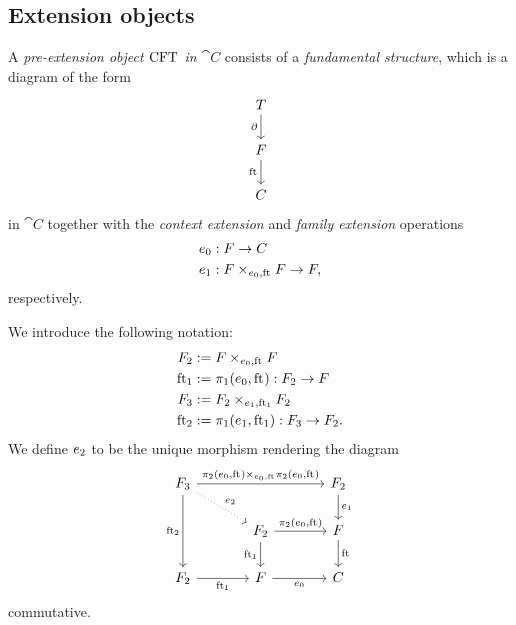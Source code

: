 \subsection{Extension objects}
\begin{defn}
A \emph{pre-extension object $\mathrm{CFT}$ in $\cat{C}$} consists of a \emph{fundamental structure}, which is a diagram of the form
\begin{equation*}
\begin{tikzcd}
\stesyst
  \ar{d}[swap]{\ebd}
  \\
\stesysf
  \ar{d}[swap]{\eft}
  \\
\stesysc
\end{tikzcd}
\end{equation*}
in $\cat{C}$ together with the \emph{context extension} and \emph{family extension} operations
\begin{align*}
\ectxext &:\stesysf\to \stesysc\\
\efamext & :\stesysff\to \stesysf,
\end{align*}
respectively.
\end{defn}

\begin{defn}
We introduce the following notation:
\begin{align*}
\stesysf_2 
  & := \stesysff
  \\
\eft[1] 
  & := \pullbackpr{1}{\ectxext}{\eft} : \stesysf_2\to\stesysf
  \\
\stesysf_3 & := \pullback{\stesysf_2}{\stesysf_2}{\efamext}{\eft[1]}
  \\
\eft[2]
  & := \pullbackpr{1}{\efamext}{\eft[1]} : \stesysf_3\to\stesysf_2.
\end{align*}
We define $e_{2}$ to be the unique morphism rendering the diagram
\begin{equation*}
\begin{tikzcd}[column sep=large]
\stesysf_3
  \ar[dotted]{dr}{\eext{2}}
  \ar{rr}{\pullback{\pullbackpr{2}{\ectxext}{\eft}}{\pullbackpr{2}{\ectxext}{\eft}}{\ectxext}{\eft}}
  \ar{dd}[swap]{\eft[2]}
  & 
  &
\stesysf_2
  \ar{d}{\efamext}
  \\
  &
\stesysf_2
  \ar{d}[swap]{\eft[1]}
  \ar{r}{\pullbackpr{2}{\ectxext}{\eft}}
  &
\stesysf
  \ar{d}{\eft}
  \\
\stesysf_2
  \ar{r}[swap]{\eft[1]}
  &
\stesysf
  \ar{r}[swap]{\ectxext}
  &
\stesysc
\end{tikzcd}
\end{equation*}
commutative.
\end{defn}

